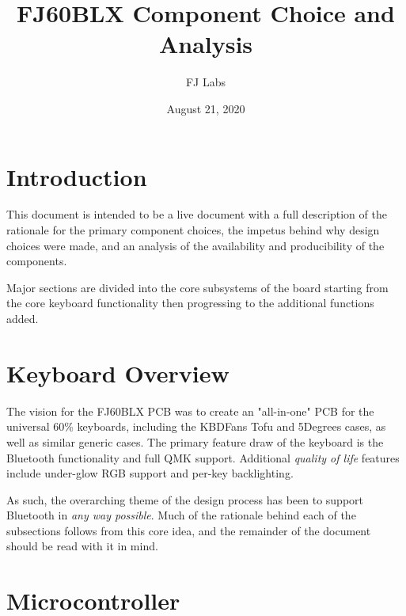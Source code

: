 \documentclass[11pt]{article}
\begin{document}
\author{FJ Labs\footnotemark}
\title{FJ60BLX Component Choice and Analysis}
\date{August 21, 2020}
\maketitle

\tableofcontents

\newpage


\section{Introduction}

This document is intended to be a live document with a full description of the rationale for the primary component choices, the impetus behind why design choices were made, and an analysis of the availability and producibility of the components.

Major sections are divided into the core subsystems of the board starting from the core keyboard functionality then progressing to the additional functions added.

\section{Keyboard Overview}

The vision for the FJ60BLX PCB was to create an "all-in-one" PCB for the universal 60\% keyboards, including the KBDFans Tofu and 5Degrees cases, as well as similar generic cases. The primary feature draw of the keyboard is the Bluetooth functionality and full QMK support. Additional \emph{quality of life} features include under-glow RGB support and per-key backlighting. 

As such, the overarching theme of the design process has been to support Bluetooth in \emph{any way possible}. Much of the rationale behind each of the subsections follows from this core idea, and the remainder of the document should be read with it in mind.

\section{Microcontroller}
\end{document}
